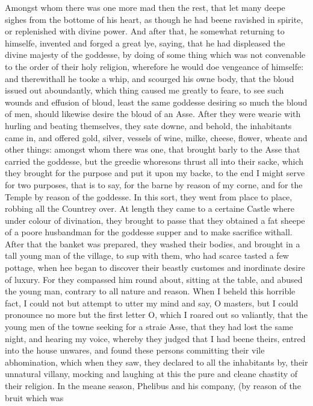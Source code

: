 Amongst whom there was one more mad then the rest, that let many deepe sighes
from the bottome of his heart, as though he had beene ravished in spirite, or
replenished with divine power. And after that, he somewhat returning to
himselfe, invented and forged a great lye, saying, that he had displeased the
divine majesty of the goddesse, by doing of some thing which was not convenable
to the order of their holy religion, wherefore he would doe vengeance of
himselfe: and therewithall he tooke a whip, and scourged his owne body, that
the bloud issued out aboundantly, which thing caused me greatly to feare, to
see such wounds and effusion of bloud, least the same goddesse desiring so much
the bloud of men, should likewise desire the bloud of an Asse. After they were
wearie with hurling and beating themselves, they sate downe, and behold, the
inhabitants came in, and offered gold, silver, vessels of wine, milke, cheese,
flower, wheate and other things: amongst whom there was one, that brought barly
to the Asse that carried the goddesse, but the greedie whoresons thrust all
into their sacke, which they brought for the purpose and put it upon my backe,
to the end I might serve for two purposes, that is to say, for the barne by
reason of my corne, and for the Temple by reason of the goddesse. In this sort,
they went from place to place, robbing all the Countrey over. At length they
came to a certaine Castle where under colour of divination, they brought to
passe that they obtained a fat sheepe of a poore husbandman for the goddesse
supper and to make sacrifice withall. After that the banket was prepared, they
washed their bodies, and brought in a tall young man of the village, to sup
with them, who had scarce tasted a few pottage, when hee began to discover
their beastly customes and inordinate desire of luxury. For they compassed him
round about, sitting at the table, and abused the young man, contrary to all
nature and reason. When I beheld this horrible fact, I could not but attempt to
utter my mind and say, O masters, but I could pronounce no more but the first
letter O, which I roared out so valiantly, that the young men of the towne
seeking for a straie Asse, that they had lost the same night, and hearing my
voice, whereby they judged that I had beene theirs, entred into the house
unwares, and found these persons committing their vile abhomination, which when
they saw, they declared to all the inhabitants by, their unnatural villany,
mocking and laughing at this the pure and cleane chastity of their religion. In
the meane season, Phelibus and his company, (by reason of the bruit which was
